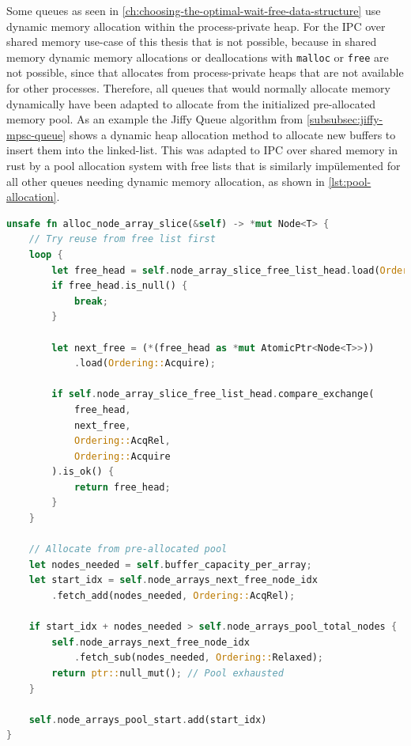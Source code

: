 Some queues as seen in \cref{ch:choosing-the-optimal-wait-free-data-structure} use dynamic memory allocation within the process-private heap. For the \ac{IPC} over shared memory use-case of this thesis that is not possible, because in shared memory dynamic memory allocations or deallocations with \texttt{malloc} or \texttt{free} are not possible, since that allocates from process-private heaps that are not available for other processes. Therefore, all queues that would normally allocate memory dynamically have been adapted to allocate from the initialized pre-allocated memory pool. As an example the Jiffy Queue algorithm from \cref{subsubsec:jiffy-mpsc-queue} shows a dynamic heap allocation method to allocate new buffers to insert them into the linked-list. This was adapted to \ac{IPC} over shared memory in rust by a pool allocation system with free lists that is similarly impülemented for all other queues needing dynamic memory allocation, as shown in \cref{lst:pool-allocation}.

\begin{lstlisting}[language=Rust, style=boxed, caption={Lock-free memory pool allocation}, label={lst:pool-allocation}]
unsafe fn alloc_node_array_slice(&self) -> *mut Node<T> {
    // Try reuse from free list first
    loop {
        let free_head = self.node_array_slice_free_list_head.load(Ordering::Acquire);
        if free_head.is_null() {
            break;
        }
        
        let next_free = (*(free_head as *mut AtomicPtr<Node<T>>))
            .load(Ordering::Acquire);
            
        if self.node_array_slice_free_list_head.compare_exchange(
            free_head, 
            next_free, 
            Ordering::AcqRel, 
            Ordering::Acquire
        ).is_ok() {
            return free_head;
        }
    }
    
    // Allocate from pre-allocated pool
    let nodes_needed = self.buffer_capacity_per_array;
    let start_idx = self.node_arrays_next_free_node_idx
        .fetch_add(nodes_needed, Ordering::AcqRel);
        
    if start_idx + nodes_needed > self.node_arrays_pool_total_nodes {
        self.node_arrays_next_free_node_idx
            .fetch_sub(nodes_needed, Ordering::Relaxed);
        return ptr::null_mut(); // Pool exhausted
    }
    
    self.node_arrays_pool_start.add(start_idx)
}
\end{lstlisting}


